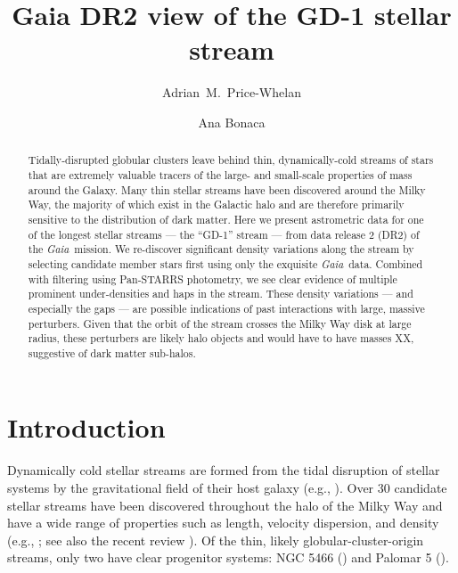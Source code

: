 \documentclass[modern]{aastex62}
\newcommand{\acronym}[1]{{\small{#1}}}
\newcommand{\gaia}{\textsl{Gaia}}
\newcommand{\DR}{\acronym{DR2}}
\begin{document}
\sloppy\sloppypar\raggedbottom\frenchspacing %

\title{Gaia DR2 view of the GD-1 stellar stream}

\author[0000-0003-0872-7098]{Adrian~M.~Price-Whelan}

\author[0000-0002-7846-9787]{Ana Bonaca}


\begin{abstract}\noindent %
Tidally-disrupted globular clusters leave behind thin, dynamically-cold streams
of stars that are extremely valuable tracers of the large- and small-scale
properties of mass around the Galaxy.
Many thin stellar streams have been discovered around the Milky Way, the
majority of which exist in the Galactic halo and are therefore primarily
sensitive to the distribution of dark matter.
Here we present astrometric data for one of the longest stellar streams --- the
``GD-1'' stream --- from data release 2 (\DR) of the \gaia\ mission.
We re-discover significant density variations along the stream by selecting
candidate member stars first using only the exquisite \gaia\ data.
Combined with filtering using Pan-STARRS photometry, we see clear evidence of
multiple prominent under-densities and haps in the stream.
These density variations --- and especially the gaps --- are possible
indications of past interactions with large, massive perturbers.
Given that the orbit of the stream crosses the Milky Way disk at large radius,
these perturbers are likely halo objects and would have to have masses XX,
suggestive of dark matter sub-halos.
\end{abstract}


\section{Introduction}
\label{sec:intro}

Dynamically cold stellar streams are formed from the tidal disruption of stellar
systems by the gravitational field of their host galaxy (e.g.,
\citealt{Johnston:1998}).
Over 30 candidate stellar streams have been discovered throughout the halo of
the Milky Way and have a wide range of properties such as length, velocity
dispersion, and density (e.g., \citealt{SoManyPeople,Bonaca:2012}; see also the
recent review \citealt{Grillmair:2006, Newberg:2016}).
Of the thin, likely globular-cluster-origin streams, only two have clear
progenitor systems: NGC 5466 (\citealt{TODO}) and Palomar 5 (\citealt{TODO}).
\end{document}
